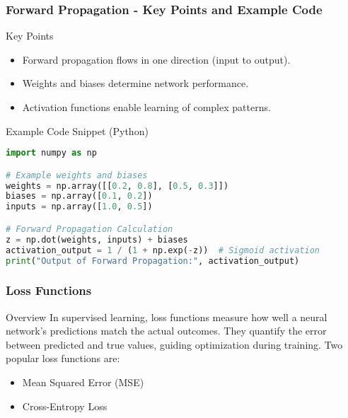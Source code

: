 \documentclass[aspectratio=169]{beamer}
\begin{document}
\begin{frame}[fragile]
  \frametitle{Forward Propagation - Key Points and Example Code}
  \begin{block}{Key Points}
    \begin{itemize}
      \item Forward propagation flows in one direction (input to output).
      \item Weights and biases determine network performance.
      \item Activation functions enable learning of complex patterns.
    \end{itemize}
  \end{block}

  \begin{block}{Example Code Snippet (Python)}
    \begin{lstlisting}[language=Python]
import numpy as np

# Example weights and biases
weights = np.array([[0.2, 0.8], [0.5, 0.3]])
biases = np.array([0.1, 0.2])
inputs = np.array([1.0, 0.5])

# Forward Propagation Calculation
z = np.dot(weights, inputs) + biases
activation_output = 1 / (1 + np.exp(-z))  # Sigmoid activation
print("Output of Forward Propagation:", activation_output)
    \end{lstlisting}
  \end{block}
\end{frame}

\begin{frame}[fragile]
  \frametitle{Loss Functions}
  \begin{block}{Overview}
    In supervised learning, loss functions measure how well a neural network's predictions match the actual outcomes. They quantify the error between predicted and true values, guiding optimization during training. Two popular loss functions are:
    \begin{itemize}
      \item Mean Squared Error (MSE)
      \item Cross-Entropy Loss
    \end{itemize}
  \end{block}
\end{frame}
\end{document}
